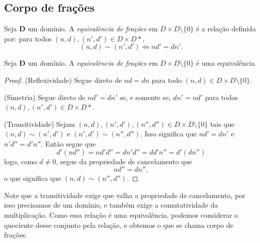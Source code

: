 \subsection{Corpo de frações}

\begin{definition}
Seja $\bm D$ um domínio. A \emph{equivalência de frações} em $D \times D \setminus \{0\}$ é a relação definida por: para todos $(n,d),(n',d') \in D \times D*$,
	\begin{equation*}
	(n,d) \sim (n',d') \Leftrightarrow nd' = dn'.
	\end{equation*}
\end{definition}

\begin{proposition}
Seja $\bm D$ um domínio. A \emph{equivalência de frações} em $D \times D \setminus \{0\}$ é uma equivalência.
\end{proposition}
\begin{proof}
(Reflexividade) Segue direto de $nd=dn$ para todo $(n,d) \in D \times D \setminus \{0\}$.

(Simetria) Segue direto de $nd'=dn'$ se, e somente se, $dn'=nd'$ para todos $(n,d),(n',d') \in D \times D*$.

(Transitividade) Sejam $(n,d),(n',d'),(n'',d'') \in D \times D \setminus \{0\}$ tais que $(n,d) \sim (n',d')$ e $(n',d') \sim (n'',d'')$. Isso significa que $nd' = dn'$ e $n'd'' = d'n''$. Então segue que
	\begin{equation*}
	d'(nd'') = nd'd'' = dn'd'' = dd'n'' = d'(dn'')
	\end{equation*}
logo, como $d \neq 0$, segue da propriedade de cancelamento que
	\begin{equation*}
	nd'' = dn'',
	\end{equation*}
o que significa que $(n,d) \sim (n'',d'')$.
\end{proof}

Note que a transitividade exige que valha a propriedade de cancelamento, por isso precisamos de um domínio, e também exige a comutatividade da multiplicação. Como essa relação é uma equivalência, podemos considerar o quociente desse conjunto pela relação, e obtemos o que se chama corpo de frações.

